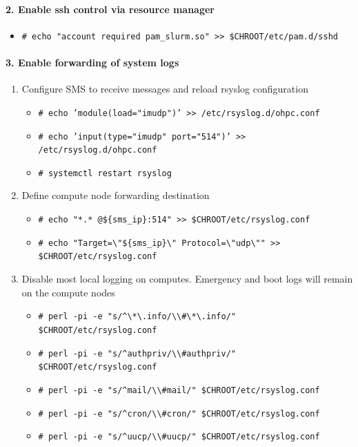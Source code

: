 {\paragraph{2. Enable ssh control via resource manager}
\begin{itemize}
\item \verb|# echo "account required pam_slurm.so" >> $CHROOT/etc/pam.d/sshd|
\end{itemize}


\paragraph{3. Enable forwarding of system logs}
\begin{enumerate}
\item Configure SMS to receive messages and reload rsyslog configuration
\begin{itemize}
\item \verb|# echo ’module(load="imudp")’ >> /etc/rsyslog.d/ohpc.conf|

\item \verb|# echo ’input(type="imudp" port="514")’ >> /etc/rsyslog.d/ohpc.conf|

\item \verb|# systemctl restart rsyslog|
\end{itemize}

\item Define compute node forwarding destination
\begin{itemize}
\item \verb|# echo "*.* @${sms_ip}:514" >> $CHROOT/etc/rsyslog.conf|
\item \verb|# echo "Target=\"${sms_ip}\" Protocol=\"udp\"" >> $CHROOT/etc/rsyslog.conf|
\end{itemize}

\item Disable most local logging on computes. Emergency and boot logs will remain on the compute nodes
\begin{itemize}
\item \verb|# perl -pi -e "s/^\*\.info/\\#\*\.info/" $CHROOT/etc/rsyslog.conf|
\item \verb|# perl -pi -e "s/^authpriv/\\#authpriv/" $CHROOT/etc/rsyslog.conf|
\item \verb|# perl -pi -e "s/^mail/\\#mail/" $CHROOT/etc/rsyslog.conf |
\item \verb|# perl -pi -e "s/^cron/\\#cron/" $CHROOT/etc/rsyslog.conf|
\item \verb|# perl -pi -e "s/^uucp/\\#uucp/" $CHROOT/etc/rsyslog.conf|
\end{itemize}
\end{enumerate}

}
